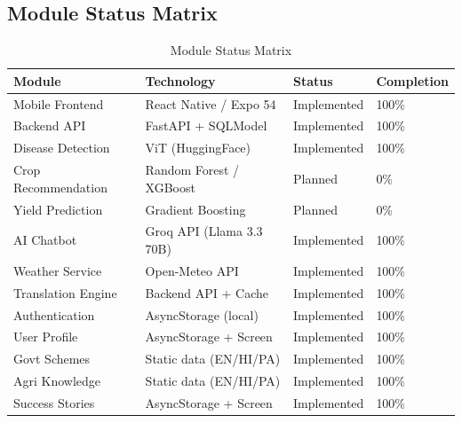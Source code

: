 \documentclass[12pt,a4paper]{article}
\newcommand{\tablefont}{\fontsize{10}{12}\selectfont}
\begin{document}
\subsection{Module Status Matrix}

\begin{table}[H]
\centering
\tablefont
\begin{tabular}{|p{4cm}|p{3.5cm}|p{2cm}|p{2.5cm}|}
\hline
\textbf{Module} & \textbf{Technology} & \textbf{Status} & \textbf{Completion} \\
\hline
Mobile Frontend & React Native / Expo 54 & Implemented & 100\% \\
Backend API & FastAPI + SQLModel & Implemented & 100\% \\
Disease Detection & ViT (HuggingFace) & Implemented & 100\% \\
Crop Recommendation & Random Forest / XGBoost & Planned & 0\% \\
Yield Prediction & Gradient Boosting & Planned & 0\% \\
AI Chatbot & Groq API (Llama 3.3 70B) & Implemented & 100\% \\
Weather Service & Open-Meteo API & Implemented & 100\% \\
Translation Engine & Backend API + Cache & Implemented & 100\% \\
Authentication & AsyncStorage (local) & Implemented & 100\% \\
User Profile & AsyncStorage + Screen & Implemented & 100\% \\
Govt Schemes & Static data (EN/HI/PA) & Implemented & 100\% \\
Agri Knowledge & Static data (EN/HI/PA) & Implemented & 100\% \\
Success Stories & AsyncStorage + Screen & Implemented & 100\% \\
\hline
\end{tabular}
\caption{Module Status Matrix}
\end{table}
\end{document}

